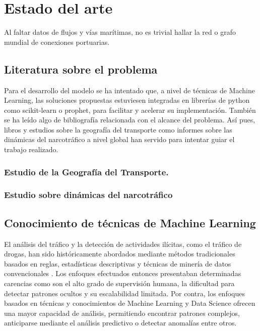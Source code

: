 \documentclass[12pt]{article}
\begin{document}
\newpage

\section{Estado del arte}
Al faltar datos de flujos y vías marítimas, no es trivial hallar la red o grafo mundial de conexiones portuarias.

	\subsection{Literatura sobre el problema}
	Para el desarrollo del modelo se ha intentado que, a nivel de técnicas de Machine Learning, las soluciones propuestas estuviesen integradas en librerías de python como scikit-learn o prophet, para facilitar y acelerar su implementación. También se ha leído algo de bibliografía relacionada con el alcance del problema. Así pues, libros y estudios sobre la geografía del transporte como informes sobre las dinámicas del narcotráfico a nivel global han servido para intentar guiar el trabajo realizado. 
	
		\subsubsection{Estudio de la Geografía del Transporte.}
		
		
		
		\subsubsection{Estudio sobre dinámicas del narcotráfico}


	\subsection{Conocimiento de técnicas de Machine Learning}
	El análisis del tráfico y la detección de actividades ilícitas, como el tráfico de drogas, han sido históricamente abordados mediante métodos tradicionales basados en reglas, estadísticas descriptivas y técnicas de minería de datos convencionales \cite{}. Los enfoques efectuados entonces presentaban determinadas carencias como son el alto grado de supervisión humana, la dificultad para detectar patrones ocultos y su escalabilidad limitada.
	Por contra, los enfoques basados en técnicas y conocimientos de Machine Learning y Data Science ofrecen una mayor capacidad de análisis, permitiendo encontrar patrones complejos, anticiparse mediante el análisis predictivo o detectar anomalías entre otros.
	
\end{document}
